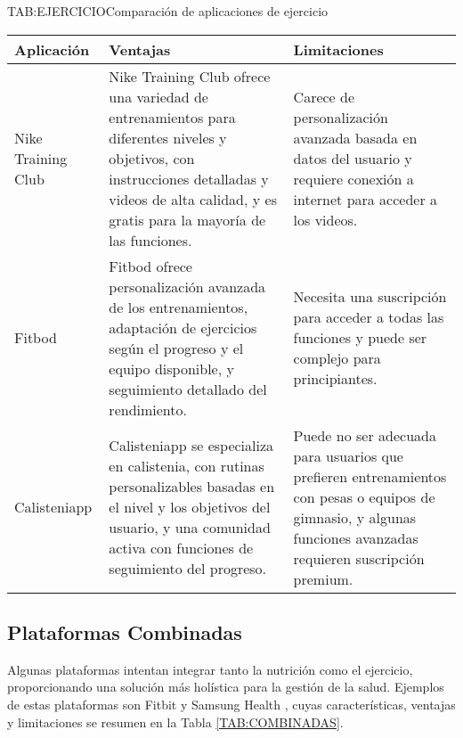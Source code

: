 \begin{table}[Comparación de aplicaciones de ejercicio]{TAB:EJERCICIO}{Comparación de aplicaciones de ejercicio}
  \begin{tabular}{|p{3cm}|p{5cm}|p{5cm}|}
    \hline
    \textbf{Aplicación} & \textbf{Ventajas} & \textbf{Limitaciones} \\
    \hline
    Nike Training Club & Nike Training Club ofrece una variedad de entrenamientos para diferentes niveles y objetivos, con instrucciones detalladas y videos de alta calidad, y es gratis para la mayoría de las funciones. & Carece de personalización avanzada basada en datos del usuario y requiere conexión a internet para acceder a los videos. \\
    \hline
    Fitbod & Fitbod ofrece personalización avanzada de los entrenamientos, adaptación de ejercicios según el progreso y el equipo disponible, y seguimiento detallado del rendimiento. & Necesita una suscripción para acceder a todas las funciones y puede ser complejo para principiantes. \\
    \hline
    Calisteniapp & Calisteniapp se especializa en calistenia, con rutinas personalizables basadas en el nivel y los objetivos del usuario, y una comunidad activa con funciones de seguimiento del progreso. & Puede no ser adecuada para usuarios que prefieren entrenamientos con pesas o equipos de gimnasio, y algunas funciones avanzadas requieren suscripción premium. \\
    \hline
  \end{tabular}
\end{table}

\subsection{Plataformas Combinadas}

Algunas plataformas intentan integrar tanto la nutrición como el ejercicio, proporcionando una solución más holística para la gestión de la salud. Ejemplos de estas plataformas son Fitbit \cite{Fitbit} y Samsung Health \cite{SamsungHealth}, cuyas características, ventajas y limitaciones se resumen en la Tabla \ref{TAB:COMBINADAS}.

